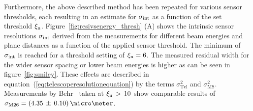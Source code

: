 Furthermore, the above described method has been repeated for various sensor thresholds, each resulting in an estimate for $\sigma_{\textrm{int}}$ as a function of the set threshold $\xi_{\textrm{n}}$. 
Figure~\ref{fig:resivsenergy_thresh} (A) shows the intrinsic sensor resolutions $\sigma_{\textrm{int}}$ derived from the measurements for different beam energies and plane distances as a function of the applied sensor threshold.
The minimum of $\sigma_{\textrm{int}}$ is reached for a threshold setting of $\xi_{\textrm{n}} = 6$.
The measured residual width for the wider sensor spacing or lower beam energies is higher as can be seen in figure~\ref{fig:smiley}.
These effects are described in equation~(\ref{eq:telescoperesolutionequation}) by the terms $\sigma_{\textrm{Tel}}^2$ and $\sigma_{\textrm{MS}}^2$.
Measurements by Behr~\cite{ref:j.behrmeasurements} taken at $\xi_{\textrm{n}}\,>\,10$ show comparable results of $\sigma_{\textrm{M26}} = (4.35\,\pm\,0.10)\,\micro\meter$.




